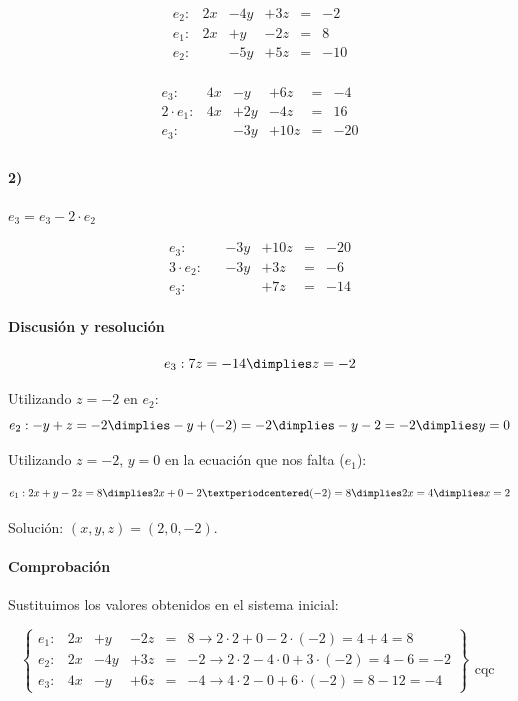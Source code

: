 \documentclass[palatino,nosec,nochap]{Docencia}
\begin{document}
\begin{problem}
\[
\begin{array}{rccccc}
e_2: &	2x &	-	4y &	+ 3z &	= & -2 \\
e_1: &	2x &	+	y  &	- 2z &	= & 8 \\
\hline
e_2: &	   &	-	5y &	+ 5z &	= & -10\\
\end{array}
\]	


\[
\begin{array}{rccccc}
e_3:   &	4x &	-	y   &	+ 6z &	= & -4 \\
2·e_1: &	4x &	+	2y  &	- 4z &	= & 16 \\
\hline
e_3:   &	   &	-	3y &	+ 10z &	= & -20\\
\end{array}
\]	


\paragraph{2)} $e_3 = e_3-2·e_2$

\[
\begin{array}{rccccc}
e_3: &	   &	-	3y &	+ 10z &	= & -20\\
3·e_2: &   &	-	3y &	+  3z &	= & -6\\
\hline
e_3: &	   &		   &	+  7z & = &-14
\end{array}
\]	


\paragraph{Discusión y resolución}

\[e_3: 7z=-14 \dimplies z=-2\]


Utilizando $z=-2$ en $e_2$:
\[e_2: -y+z=-2 \dimplies -y + (-2) = -2 \dimplies -y-2=-2 \dimplies y=0\]

Utilizando $z=-2$, $y=0$ en la ecuación que nos falta ($e_1$):

\[
e_1: 2x	+ y - 2z = 8 \dimplies 2x + 0 - 2·(-2) = 8 \dimplies 2x=4 \dimplies x=2
\]


Solución: $(x,y,z) = (2,0,-2)$.

\paragraph{Comprobación}

Sustituimos los valores obtenidos en el sistema inicial:

\[
\left\{\begin{array}{lccccl}
e_1: &	2x &	+	y &		- 2z &	= & 8 \to 2·2 + 0 - 2·(-2) = 4+4 = 8\\
e_2: &	2x &	-	4y &	+ 3z &	= & -2 \to 2·2 - 4·0 + 3·(-2) = 4-6 = -2\\
e_3: &	4x &	-	y &		+ 6z &	= & -4 \to 4·2 - 0 + 6·(-2) = 8-12 = -4
\end{array}\right\}\begin{array}{c}\\\\\\\\\text{cqc}\end{array}
\]

\end{problem}
\end{document}
